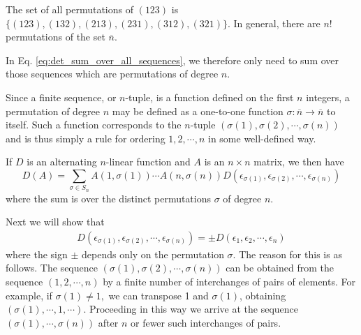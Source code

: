 \documentclass[12pt,letterpaper,reqno]{article}
\numberwithin{equation}{section}
\begin{document}
\begin{example}
	The set of all permutations of $(123)$ is $\{(123), (132), (213), (231), (312), (321)\}$. In general, there are $n!$ permutations of the set $\overline{n}$.	
\end{example}


In Eq. \eqref{eq:det_sum_over_all_sequences}, we therefore only need to sum over those sequences which are permutations of degree $n$.

Since a finite sequence, or $n$-tuple, is a function defined on the first $n$ integers, a permutation of degree $n$ may be defined as a one-to-one function $\sigma:\overline{n} \to \overline{n}$ to itself. Such a function corresponds to the $n$-tuple $(\sigma(1),\sigma(2),\cdots,\sigma(n))$ and is thus simply a rule for ordering $1,2,\cdots,n$ in some well-defined way.

If $D$ is an alternating $n$-linear function and $A$ is an $n \times n$ matrix, we then have 
\begin{equation}\label{eq:expression_for_d_a}
	D(A)=\sum_{\sigma \in S_n}A(1,\sigma(1))\cdots A(n,\sigma(n))D(\epsilon_{\sigma(1)},\epsilon_{\sigma(2)},\cdots,\epsilon_{\sigma(n)})
\end{equation}
where the sum is over the distinct permutations $\sigma$ of degree $n$.

Next we will show that 
\begin{align*}
	D(\epsilon_{\sigma(1)},\epsilon_{\sigma(2)},\cdots,\epsilon_{\sigma(n)})=\pm D(\epsilon_1,\epsilon_2,\cdots, \epsilon_n)
\end{align*}
where the sign $\pm$ depends only on the permutation $\sigma$. The reason for this is as follows. The sequence $(\sigma(1),\sigma(2),\cdots,\sigma(n))$ can be obtained from the sequence $(1,2,\cdots,n)$ by a finite number of interchanges of pairs of elements. For example, if $\sigma(1) \neq 1,$ we can transpose 1 and $\sigma(1)$, obtaining $(\sigma(1),\cdots,1,\cdots)$. Proceeding in this way we arrive at the sequence $(\sigma(1),\cdots,\sigma(n))$ after $n$ or fewer such interchanges of pairs.
\end{document}
